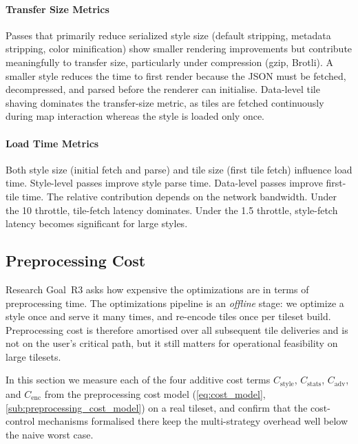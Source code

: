 \paragraph{Transfer Size Metrics}
Passes that primarily reduce serialized style size (default stripping, metadata stripping, color minification) show smaller rendering improvements but contribute meaningfully to transfer size, particularly under compression (gzip, Brotli).
A smaller style reduces the time to first render because the \ac{JSON} must be fetched, decompressed, and parsed before the renderer can initialise.
Data-level tile shaving dominates the transfer-size metric, as tiles are fetched continuously during map interaction whereas the style is loaded only once.

\paragraph{Load Time Metrics}
Both style size (initial fetch and parse) and tile size (first tile fetch) influence load time.
Style-level passes improve style parse time.
Data-level passes improve first-tile time.
The relative contribution depends on the network bandwidth.
Under the \qty{10}{\Mbps} throttle, tile-fetch latency dominates.
Under the \qty{1.5}{\Mbps} throttle, style-fetch latency becomes significant for large styles.

\subsection{Preprocessing Cost}\label{sub:preprocessing_cost}

Research Goal~R3 asks how expensive the optimizations are in terms of preprocessing time.
The optimizations pipeline is an \emph{offline} stage: we optimize a style once and serve it many times, and re-encode tiles once per tileset build.
Preprocessing cost is therefore amortised over all subsequent tile deliveries and is not on the user's critical path, but it still matters for operational feasibility on large tilesets.

In this section we measure each of the four additive cost terms $C_\text{style}$, $C_\text{stats}$, $C_\text{adv}$, and $C_\text{enc}$ from the preprocessing cost model (\cref{eq:cost_model}, \cref{sub:preprocessing_cost_model}) on a real tileset, and confirm that the cost-control mechanisms formalised there keep the multi-strategy overhead well below the naive worst case.

